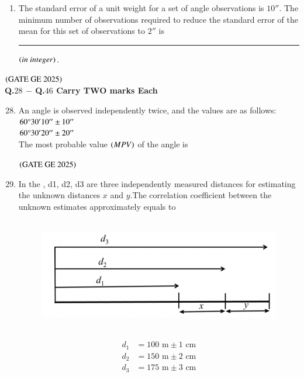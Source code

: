 \documentclass[journal,12pt,onecolumn]{IEEEtran}
\theoremstyle{remark}
\begin{document}
\begin{enumerate}
\item The standard error of a unit weight for a set of angle observations is $10''$.
The minimum number of observations required to reduce the standard error of the mean for this set of observations to $2''$ is \rule{2cm}{0.5mm} $\left(in\ integer\right)$.\\
\end{enumerate}
\hfill $\left(\text{GATE GE 2025}\right)$
\bigskip
\\
\textbf{Q.$28$ $-$ Q.$46$ Carry TWO marks Each}\\
\begin{enumerate}
\setcounter{enumi}{27}
\item An angle is observed independently twice, and the values are as follows:\\
$60\degree30'10'' \pm 10''$\\
$60\degree30'20'' \pm 20''$\\
The most probable value $\left(MPV\right)$ of the angle is
\begin{enumerate}
\end{enumerate}
\hfill $\left(\text{GATE GE 2025}\right)$
\bigskip
\item In the , d1, d2, d3 are three independently measured distances for estimating the unknown distances $x$ and $y$.The correlation coefficient between the unknown estimates approximately equals to\\
\\

\begin{figure}[H]
    \centering
    \includegraphics[width=0.5\columnwidth]{figs/fig5.png}
    \caption{}
    \label{figs:fig5}
\end{figure}\\

\begin{align*}
d_1 &= 100 \text{ m} \pm 1 \text{ cm} \\
d_2 &= 150 \text{ m} \pm 2 \text{ cm} \\
d_3 &= 175 \text{ m} \pm 3 \text{ cm}
\end{align*}


\end{enumerate}
\end{document}
